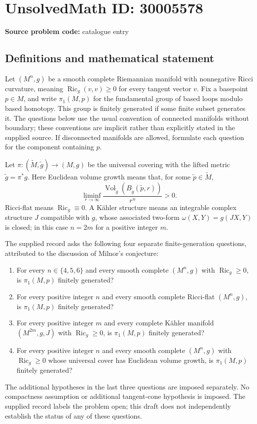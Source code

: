 \documentclass[11pt]{article}
\begin{document}
\section*{UnsolvedMath ID: 30005578}
\textbf{Source problem code:} catalogue entry
\subsection{Definitions and mathematical statement}
Let \((M^n,g)\) be a smooth complete Riemannian manifold with nonnegative Ricci curvature, meaning \(\operatorname{Ric}_g(v,v)\geq 0\) for every tangent vector \(v\). Fix a basepoint \(p\in M\), and write \(\pi_1(M,p)\) for the fundamental group of based loops modulo based homotopy. This group is finitely generated if some finite subset generates it. The questions below use the usual convention of connected manifolds without boundary; these conventions are implicit rather than explicitly stated in the supplied source. If disconnected manifolds are allowed, formulate each question for the component containing \(p\).

Let \(\pi:(\widetilde M,\widetilde g)\to(M,g)\) be the universal covering with the lifted metric \(\widetilde g=\pi^*g\). Here Euclidean volume growth means that, for some \(\widetilde p\in\widetilde M\),
\[
\liminf_{r\to\infty}\frac{\operatorname{Vol}_{\widetilde g}(B_{\widetilde g}(\widetilde p,r))}{r^n}>0.
\]
Ricci-flat means \(\operatorname{Ric}_g\equiv0\). A Kähler structure means an integrable complex structure \(J\) compatible with \(g\), whose associated two-form \(\omega(X,Y)=g(JX,Y)\) is closed; in this case \(n=2m\) for a positive integer \(m\).

The supplied record asks the following four separate finite-generation questions, attributed to the discussion of Milnor's conjecture:
\begin{enumerate}
\item For every \(n\in\{4,5,6\}\) and every smooth complete \((M^n,g)\) with \(\operatorname{Ric}_g\geq0\), is \(\pi_1(M,p)\) finitely generated?
\item For every positive integer \(n\) and every smooth complete Ricci-flat \((M^n,g)\), is \(\pi_1(M,p)\) finitely generated?
\item For every positive integer \(m\) and every complete Kähler manifold \((M^{2m},g,J)\) with \(\operatorname{Ric}_g\geq0\), is \(\pi_1(M,p)\) finitely generated?
\item For every positive integer \(n\) and every smooth complete \((M^n,g)\) with \(\operatorname{Ric}_g\geq0\) whose universal cover has Euclidean volume growth, is \(\pi_1(M,p)\) finitely generated?
\end{enumerate}
The additional hypotheses in the last three questions are imposed separately. No compactness assumption or additional tangent-cone hypothesis is imposed. The supplied record labels the problem open; this draft does not independently establish the status of any of these questions.
\end{document}
